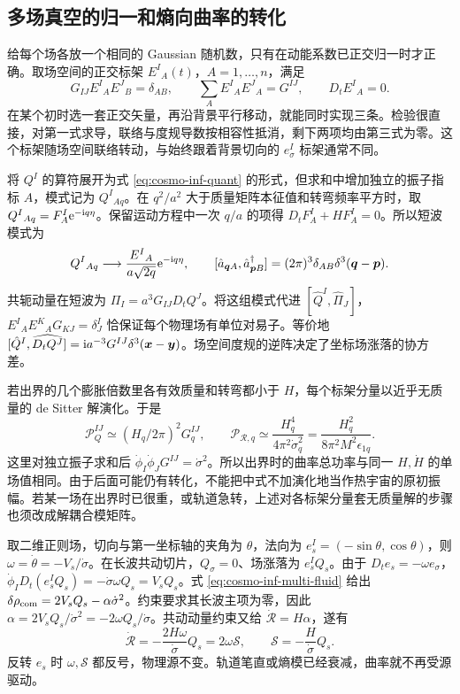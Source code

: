 \subsection{多场真空的归一和熵向曲率的转化}\label{sec:cosmo-inf-transfer}

给每个场各放一个相同的 Gaussian 随机数，只有在动能系数已正交归一时才正确。取场空间的正交标架 $E^I{}_A(t)$，$A=1,\ldots,n$，满足
\[
 G_{IJ}E^I{}_A E^J{}_B=\delta_{AB},\qquad
 \sum_A E^I{}_A E^J{}_A=G^{IJ},\qquad D_t E^I{}_A=0 .
\]
在某个初时选一套正交矢量，再沿背景平行移动，就能同时实现三条。检验很直接，对第一式求导，联络与度规导数按相容性抵消，剩下两项均由第三式为零。这个标架随场空间联络转动，与始终跟着背景切向的 $e_\sigma^I$ 标架通常不同。

将 $Q^I$ 的算符展开为式 \eqref{eq:cosmo-inf-quant} 的形式，但求和中增加独立的振子指标 $A$，模式记为 $Q^I{}_{Aq}$。在 $q^2/a^2$ 大于质量矩阵本征值和转弯频率平方时，取 $Q^I{}_{Aq}=F^I_A\mathrm{e}^{-\mathrm{i} q\eta}$。保留运动方程中一次 $q/a$ 的项得 $D_tF^I_A+HF^I_A=0$。所以短波模式为
\begin{equation}\label{eq:cosmo-inf-multi-WKB}
 Q^I{}_{Aq}\longrightarrow
 \frac{E^I{}_A}{a\sqrt{2q}}\mathrm{e}^{-\mathrm{i} q\eta},\qquad
 [\hat a_{\bm q A},\hat a^\dagger_{\bm p B}]
 =(2\pi)^3\delta_{AB}\delta^3(\bm q-\bm p).
\end{equation}
共轭动量在短波为 $\Pi_I=a^3G_{IJ}D_tQ^J$。将这组模式代进 $[\hat Q^I,\hat\Pi_J]$，$E^I{}_A E^K{}_A G_{KJ}=\delta^I_J$ 恰保证每个物理场有单位对易子。等价地 $[\hat Q^I,\widehat{D_tQ^J}]=\mathrm{i} a^{-3}G^{IJ}\delta^3(\bm x-\bm y)$。场空间度规的逆阵决定了坐标场涨落的协方差。

若出界的几个膨胀倍数里各有效质量和转弯都小于 $H$，每个标架分量以近乎无质量的 de Sitter 解演化。于是
\begin{equation}\label{eq:cosmo-inf-multi-power}
 \mathcal P_Q^{IJ}\simeq(H_q/2\pi)^2G^{IJ}_q,\qquad
 \mathcal P_{\mathcal R,q}\simeq
 \frac{H_q^4}{4\pi^2\dot\sigma_q^2}
 =\frac{H_q^2}{8\pi^2M^2\epsilon_{1q}} .
\end{equation}
这里对独立振子求和后 $\dot\phi_I\dot\phi_JG^{IJ}=\dot\sigma^2$。所以出界时的曲率总功率与同一 $H,\dot H$ 的单场值相同。由于后面可能仍有转化，不能把中式不加演化地当作热宇宙的原初振幅。若某一场在出界时已很重，或轨道急转，上述对各标架分量套无质量解的步骤也须改成解耦合模矩阵。

取二维正则场，切向与第一坐标轴的夹角为 $\theta$，法向为 $e_s^I=(-\sin\theta,\cos\theta)$，则 $\omega=\dot\theta=-V_s/\dot\sigma$。在长波共动切片，$Q_\sigma=0$、场涨落为 $e_s^I Q_s$。由于 $D_te_s=-\omega e_\sigma$，$\dot\phi_I D_t(e_s^I Q_s)=-\dot\sigma\omega Q_s=V_sQ_s$。式 \eqref{eq:cosmo-inf-multi-fluid} 给出 $\delta\rho_{\rm com}=2V_s Q_s-\alpha\dot\sigma^2$。约束要求其长波主项为零，因此 $\alpha=2V_sQ_s/\dot\sigma^2=-2\omega Q_s/\dot\sigma$。共动动量约束又给 $\dot{\mathcal R}=H\alpha$，遂有
\begin{equation}\label{eq:cosmo-inf-entropy-source}
 \dot{\mathcal R}=-\frac{2H\omega}{\dot\sigma}Q_s
                 =2\omega\mathcal S,\qquad
 \mathcal S=-\frac{H}{\dot\sigma}Q_s .
\end{equation}
反转 $e_s$ 时 $\omega,\mathcal S$ 都反号，物理源不变。轨道笔直或熵模已经衰减，曲率就不再受源驱动。

